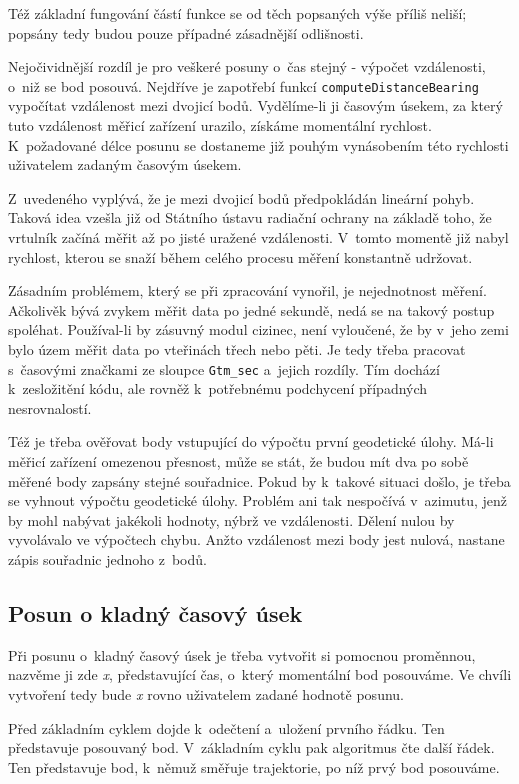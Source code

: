 Též základní fungování částí funkce se od těch popsaných výše příliš neliší; po\-psány tedy
budou pouze případné zásadnější odlišnosti. 

Nejočividnější rozdíl je pro veškeré posuny o~čas stejný - výpočet vzdálenosti,
o~niž se bod posouvá. Nejdříve je zapotřebí funkcí {\tt computeDistanceBearing}
vypočítat vzdálenost mezi dvojicí bodů. Vydělíme-li ji časovým úsekem, za který tuto vzdálenost
měřicí zařízení urazilo, získáme momentální rychlost. K~požadované délce posunu
se dostaneme již pouhým vynásobením této rychlosti uživatelem zadaným časovým úsekem. 

Z~uvedeného vyplývá, že je mezi dvojicí bodů předpokládán lineární pohyb. Taková idea vzešla
již od Státního ústavu radiační ochrany na základě toho, že vrtulník začíná měřit
až po jisté uražené vzdálenosti. V~tomto momentě již nabyl rychlost, kterou se snaží během
celého procesu měření konstantně udržovat. 

Zásadním problémem, který se při zpracování vynořil, je nejednotnost měření.
Ačkolivěk bývá zvykem měřit data po jedné sekundě, nedá se na takový postup spoléhat.
Používal-li by zásuvný modul cizinec, není vyloučené, že by v~jeho zemi bylo územ měřit
data po vteřinách třech nebo pěti. Je tedy třeba pracovat s~časovými značkami ze sloupce
{\tt Gtm\_sec} a~jejich rozdíly. Tím dochází k~zesložitění kódu, ale rovněž k~potřebnému
podchycení případných nesrovnalostí. 

Též je třeba ověřovat body vstupující do výpočtu první geodetické úlohy. Má-li měřicí zařízení
omezenou přesnost, může se stát, že budou mít dva po sobě měřené body zapsány stejné souřadnice.
Pokud by k~takové situaci došlo, je třeba se vyhnout výpočtu geodetické úlohy. Problém ani
tak nespočívá v~azimutu, jenž by mohl nabývat jakékoli hodnoty, nýbrž ve vzdálenosti.
Dělení nulou by vyvolávalo ve výpočtech chybu. Anžto vzdálenost mezi body jest nulová,
nastane zápis souřadnic jednoho z~bodů. 

\subsection{Posun o kladný časový úsek}
\label{kladnycas}

Při posunu o~kladný časový úsek je třeba vytvořit si pomocnou proměnnou, nazvěme ji zde \textit{x},
představující čas, o~který momentální bod posouváme. Ve chvíli vytvoření tedy bude \textit{x}
rovno uživatelem zadané hodnotě posunu. 

Před základním cyklem dojde k~odečtení a~uložení prvního řádku. Ten představuje posouvaný bod.
V~základním cyklu pak algoritmus čte další řádek. Ten představuje bod, k~němuž směřuje
trajektorie, po níž prvý bod posouváme. 

